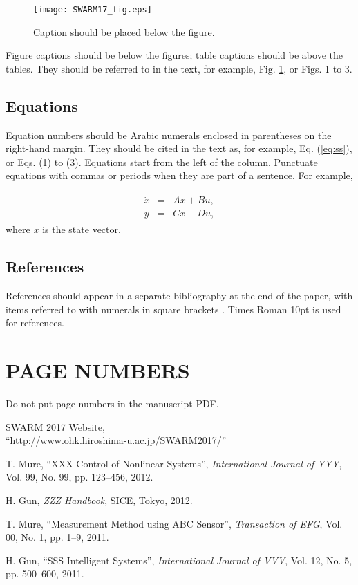 \documentclass[fleqn,10pt,twocolumn]{SWARM17}
\begin{document}
\begin{figure}[b]
\begin{center}
\texttt{[image: SWARM17\_fig.eps]}
\caption{\label{test} Caption should be placed below the figure.}
\end{center}
\end{figure}

Figure captions should be below the figures; table captions should
be above the tables.  They should be referred to in the text, for
example, Fig. \ref{test}, or Figs. 1 to 3.

\subsection{Equations}

Equation numbers should be Arabic numerals enclosed in parentheses on
the right-hand margin.  They should be cited in the text as, for
example, Eq. (\ref{eq:ss}), or Eqs. (1) to (3).  Equations start
from the left of the column.  Punctuate equations with commas or
periods when they are part of a sentence.  For example,

\begin{eqnarray}
\begin{array}{rcl}
\dot{x}&=&Ax+Bu,\\
y&=&Cx+Du,
\end{array}
\label{eq:ss}
\end{eqnarray}
where $x$ is the state vector.

\subsection{References}

References should appear in a separate bibliography at the end of the
paper, with items referred to with numerals in square brackets
\cite{ref1,ref3,ref4,ref5}.  Times Roman 10pt is used for references.

\section{PAGE NUMBERS}

Do not put page numbers in the manuscript PDF.

\begin{thebibliography}{9}
SWARM 2017 Website,\\ ``http://www.ohk.hiroshima-u.ac.jp/SWARM2017/''

T. Mure, ``XXX Control of Nonlinear Systems'',
{\it International Journal of YYY}, Vol. 99, No. 99, pp. 123--456, 2012.

H. Gun, {\it ZZZ Handbook}, SICE, Tokyo, 2012.

T. Mure, ``Measurement Method using ABC Sensor'', {\it Transaction of EFG}, 
Vol. 00, No. 1, pp. 1--9, 2011.

H. Gun, ``SSS Intelligent Systems'', {\it International Journal of VVV}, 
Vol. 12, No. 5, pp. 500--600, 2011.

\end{thebibliography}
\end{document}
